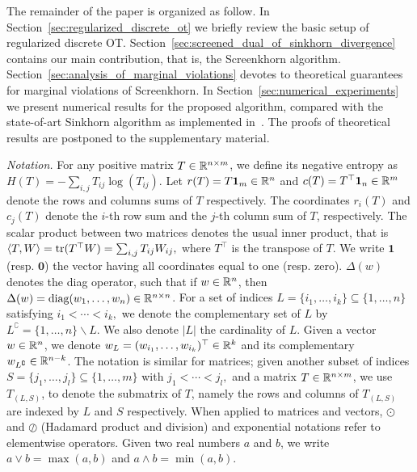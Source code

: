 The remainder of the paper is organized as follow. In Section~\ref{sec:regularized_discrete_ot} we briefly review the basic setup of regularized discrete OT. 
Section~\ref{sec:screened_dual_of_sinkhorn_divergence} contains our main contribution, that is, the Screenkhorn algorithm. 
Section~\ref{sec:analysis_of_marginal_violations} devotes to theoretical guarantees for marginal violations of Screenkhorn. 
In Section~\ref{sec:numerical_experiments} we present numerical results for the proposed algorithm, compared with the state-of-art Sinkhorn algorithm as implemented in~\cite{flamary2017pot}. 
The proofs of theoretical results are postponed to the supplementary material.

\emph{Notation.} For any positive matrix $T \in {\mathbb{R}}^{n\times m}$, we define its negative entropy as $H(T) = -\sum_{i,j} T_{ij} \log(T_{ij}).$
Let $r(T) = T\mathbf 1_m \in {\mathbb{R}}^n$ and $c(T) = T^\top\mathbf 1_n \in {\mathbb{R}}^m$ denote the rows and columns sums of $T$ respectively. The coordinates $r_i(T)$ and $c_j(T)$ denote the $i$-th row sum and the $j$-th column sum of $T$, respectively.
The scalar product between two matrices denotes the usual inner product, that is $\langle T, W \rangle = \text{tr}(T^\top W) = \sum_{i,j}T_{ij}W_{ij},$ where $T^\top$ is the transpose of $T$. 
We write $\mathbf{1}$ (resp. $\mathbf{0}$) the vector having all coordinates equal to one (resp. zero).
$\Delta(w)$ denotes the diag operator, such that if $w \in {\mathbb{R}}^n$, then $\Delta(w) = \text{diag}(w_1, \ldots, w_n)\in {\mathbb{R}}^{n\times n}$.
For a set of indices $L=\{i_1, \ldots, i_k\} \subseteq \{1, \ldots, n\}$ satisfying $i_1 < \cdots <i_k,$ we denote the complementary set of $L$ by $L^\complement = \{1, \ldots, n\} \backslash L$. We also denote $|L|$ the cardinality of $L$.
Given a vector $w \in {\mathbb{R}}^n$, we denote $w_L= (w_{i_1}, \ldots, w_{i_k})^\top \in {\mathbb{R}}^k$ and its complementary $w_{L^\complement} \in {\mathbb{R}}^{n- k}$.  The notation is similar for matrices; given another subset of indices $S = \{j_1, \ldots, j_l\} \subseteq \{1, \ldots, m\}$ with $j_1 < \cdots <j_l,$ and a matrix $T\in {\mathbb{R}}^{n\times m}$, we use $T_{(L,S)}$, to denote the submatrix of $T$, namely the rows and columns of $T_{(L,S)}$ are indexed by $L$ and $S$ respectively.
When applied to matrices and vectors,  $\odot$ and $\oslash$ (Hadamard product and division) and exponential notations refer to elementwise operators.
Given two real numbers $a$ and $b$, we write $a\vee b = \max(a,b)$ and $a\wedge b = \min(a,b).$

